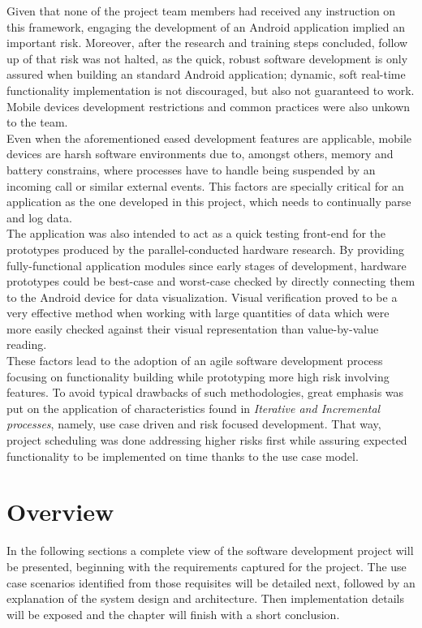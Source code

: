 	Given that none of the project team members had received any instruction on this framework, engaging the development of an Android application implied an important risk. Moreover, after the research and training steps concluded, follow up of that risk was not halted, as the quick, robust software development is only assured when building an standard Android application; dynamic, soft real-time functionality implementation is not discouraged, but also not guaranteed to work.
	Mobile devices development restrictions and common practices were also unkown to the team.\\

	Even when the aforementioned eased development features are applicable, mobile devices are harsh software environments due to, amongst others, memory and battery constrains, where processes have to handle being suspended by an incoming call or similar external events. This factors are specially critical for an application as the one developed in this project, which needs to continually parse and log data.\\

	The application was also intended to act as a quick testing front-end for the prototypes produced by the parallel-conducted hardware research. By providing fully-functional application modules since early stages of development, hardware prototypes could be best-case and worst-case checked by directly connecting them to the Android device for data visualization. Visual verification proved to be a very effective method when working with large quantities of data which were more easily checked against their visual representation than value-by-value reading.\\

	These factors lead to the adoption of an agile software development process focusing on functionality building while prototyping more high risk involving features. To avoid typical drawbacks of such methodologies, great emphasis was put on the application of characteristics found in \textit{Iterative and Incremental processes}, namely, use case driven and risk focused development. That way, project scheduling was done addressing higher risks first while assuring expected functionality to be implemented on time thanks to the use case model.\\

	\section{Overview}
	\label{sec:sw-oview}
	In the following sections a complete view of the software development project will be presented, beginning with the requirements captured for the project. The use case scenarios identified from those requisites will be detailed next, followed by an explanation of the system design and architecture. Then implementation details will be exposed and the chapter will finish with a short conclusion.

